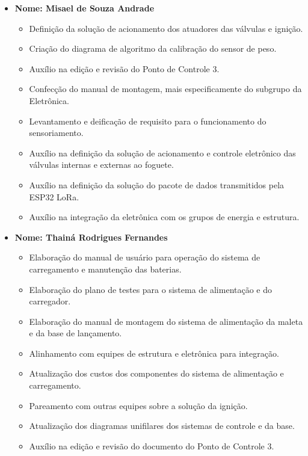 \begin{itemize}
    
    \item \textbf{Nome: Misael de Souza Andrade}
    \begin{itemize}
    \item Definição da solução de acionamento dos atuadores das válvulas e ignição.
    \item Criação do diagrama de algoritmo da calibração do sensor de peso.
    \item Auxílio na edição e revisão do Ponto de Controle 3.
    \item Confecção do manual de montagem, mais especificamente do subgrupo da Eletrônica.
   \item Levantamento e deificação de requisito para o funcionamento do sensoriamento.
   \item Auxílio na definição da solução de acionamento e controle eletrônico das válvulas internas e externas ao foguete.
   \item Auxílio na definição da solução do pacote de dados transmitidos pela ESP32 LoRa.
   \item Auxílio na integração da eletrônica com os grupos de energia e estrutura.
    \end{itemize}
    
    
    \item \textbf{Nome: Thainá Rodrigues Fernandes}
    \begin{itemize}
    \item Elaboração do manual de usuário para operação do sistema de carregamento e manutenção das baterias.
	\item Elaboração do plano de testes para o sistema de alimentação e do carregador.
	\item Elaboração do manual de montagem do sistema de alimentação da maleta e da base de lançamento.
	\item Alinhamento com equipes de estrutura e eletrônica para integração.
	\item Atualização dos custos dos componentes do sistema de alimentação e carregamento.
	\item Pareamento com outras equipes sobre a solução da ignição.
	\item Atualização dos diagramas unifilares dos sistemas de controle e da base.
	\item Auxílio na edição e revisão do documento do Ponto de Controle 3.
    \end{itemize}

    
    
    
\end{itemize}

